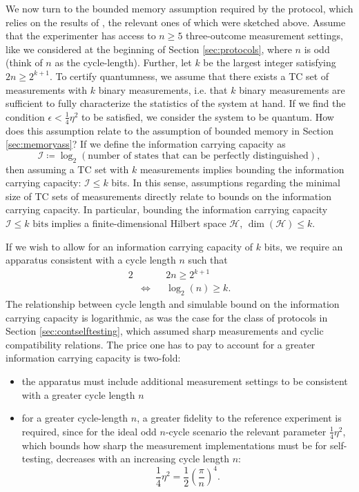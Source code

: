 We now turn to the bounded memory assumption required by the protocol, which relies on the results of \cite{Pusey2019a}, the relevant ones of which were sketched above. Assume that the experimenter has access to $n\geq 5$ three-outcome measurement settings, like we considered at the beginning of Section \ref{sec:protocols}, where $n$ is odd (think of $n$ as the cycle-length). Further, let $k$ be the largest integer satisfying $2n\geq 2^{k+1}$. To certify quantumness, we assume that there exists a TC set of measurements with $k$ binary measurements, i.e. that $k$ binary measurements are sufficient to fully characterize the statistics of the system at hand. If we find the condition $\epsilon<\frac{1}{4}\eta^2$ to be satisfied, we consider the system to be quantum.  How does this assumption relate to the assumption of bounded memory in Section \ref{sec:memoryass}? If we define the information carrying capacity as 
\begin{equation*}
\mathcal{I}\coloneqq \log_2(\text{number of states that can be perfectly distinguished}),
\end{equation*}
then assuming a TC set with $k$ measurements implies bounding the information carrying capacity: $\mathcal{I}\leq k$ bits. In this sense, assumptions regarding the minimal size of TC sets of measurements directly relate to bounds on the information carrying capacity. In particular, bounding the information carrying capacity $\mathcal{I}\leq k \text{ bits}$ implies a finite-dimensional Hilbert space $\mathcal{H}$, $\operatorname{dim}(\mathcal{H})\leq k$.

If we wish to allow for an information carrying capacity of $k$ bits, we require an apparatus consistent with a cycle length $n$ such that
\begin{alignat*}{2}
& && 2n\geq 2^{k+1} \\
& \iff && \log_2(n)\geq k.
\end{alignat*}
The relationship between cycle length and simulable bound on the information carrying capacity is logarithmic, as was the case for the class of protocols in Section \ref{sec:contselftesting}, which assumed sharp measurements and cyclic compatibility relations. The price one has to pay to account for a greater information carrying capacity is two-fold:
\begin{itemize}
\item the apparatus must include additional measurement settings to be consistent with a greater cycle length $n$
\item for a greater cycle-length $n$, a greater fidelity to the reference experiment is required, since for the ideal odd $n$-cycle scenario the relevant parameter $\frac{1}{4}\eta^2$, which bounds how sharp the measurement implementations must be for self-testing, decreases with an increasing cycle length $n$:
\begin{equation*}
\frac{1}{4}\eta^2 = \frac{1}{2}\left(\frac{\pi}{n}\right)^4.
\end{equation*}
\end{itemize}

